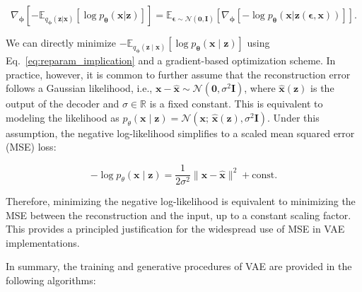 \documentclass[10pt,twocolumn,article]{memoir}
\begin{document}
\begin{equation}
\label{eq:reparam_implication}
    \nabla_{\boldsymbol{\phi}} \left[ - \mathbb{E}_{q_{\boldsymbol{\phi}}(\mathbf{z} | \mathbf{x})} \left[ \log p_{\boldsymbol{\theta}}(\mathbf{x} | \mathbf{z}) \right] \right]
    = \mathbb{E}_{\boldsymbol{\epsilon} \sim \mathcal{N}(\mathbf{0}, \mathbf{I})} \left[ \nabla_{\boldsymbol{\phi}} \left[ - \log p_{\boldsymbol{\theta}}(\mathbf{x} | \mathbf{z}(\boldsymbol{\epsilon}, \mathbf{x})) \right] \right].
\end{equation}

We can directly minimize $-\mathbb{E}_{q_{\boldsymbol{\phi}}(\mathbf{z} \mid \mathbf{x})} \left[ \log p_{\boldsymbol{\theta}}(\mathbf{x} \mid \mathbf{z}) \right]$ using Eq.~\ref{eq:reparam_implication} and a gradient-based optimization scheme. In practice, however, it is common to further assume that the reconstruction error follows a Gaussian likelihood, i.e., $\mathbf{x} - \hat{\mathbf{x}} \sim \mathcal{N}(\mathbf{0}, \sigma^2 \mathbf{I})$, where $\hat{\mathbf{x}}(\mathbf{z})$ is the output of the decoder and $\sigma \in \mathbb{R}$ is a fixed constant. This is equivalent to modeling the likelihood as $p_\theta(\mathbf{x} \mid \mathbf{z}) = \mathcal{N}(\mathbf{x}; \, \hat{\mathbf{x}}(\mathbf{z}), \sigma^2 \mathbf{I})$. Under this assumption, the negative log-likelihood simplifies to a scaled mean squared error (MSE) loss:

\begin{equation}
    -\log p_\theta(\mathbf{x} \mid \mathbf{z}) = \frac{1}{2\sigma^2} \|\mathbf{x} - \hat{\mathbf{x}}\|^2 + \text{const}.
\end{equation}

Therefore, minimizing the negative log-likelihood is equivalent to minimizing the MSE between the reconstruction and the input, up to a constant scaling factor. This provides a principled justification for the widespread use of MSE in VAE implementations.

In summary, the training and generative procedures of VAE are provided in the following algorithms:
\end{document}
